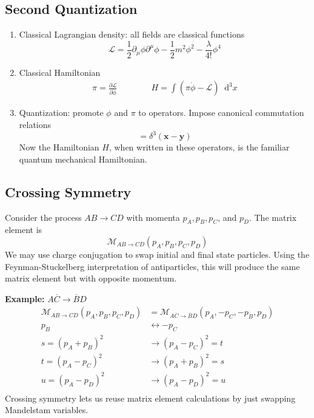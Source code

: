 \documentclass[12pt]{article}
\newcommand{\diff}{\mathop{}\!\mathrm{d}}
\theoremstyle{definition}
\begin{document}
\subsection{Second Quantization}
\begin{enumerate}
    \item Classical Lagrangian density: all fields are classical functions
        \begin{equation*}
            \mathcal{L} = \frac{1}{2} \partial_\mu \phi \partial^\mu \phi - \frac{1}{2} m^2 \phi^2 - \frac{\lambda}{4!}\phi^4
        \end{equation*}
    \item Classical Hamiltonian
        \begin{equation*}
        \begin{split}
            \pi = \frac{\partial \mathcal{L}}{\partial \dot{\phi}} \qquad \qquad
            H = \int (\pi \dot{\phi} - \mathcal{L}) \diff^3 x
        \end{split}
        \end{equation*}
    \item Quantization: promote $\phi$ and $\pi$ to operators. Impose canonical commutation relations
        \begin{equation*}
            [\phi(\bm{x}), \pi(\bm{y})] = \delta^3(\bm{x} - \bm{y})
        \end{equation*}
        Now the Hamiltonian $H$, when written in these operators, is the familiar quantum mechanical
        Hamiltonian.
\end{enumerate}

\subsection{Crossing Symmetry}
Consider the process $AB \to CD$ with momenta $p_A, p_B, p_C$, and $p_D$. The matrix element is
\begin{equation*}
    \mathcal{M}_{AB \to CD} (p_A, p_B, p_C, p_D)
\end{equation*}
We may use charge conjugation to swap initial and final state particles. Using the Feynman-Stuckelberg
interpretation of antiparticles, this will produce the same matrix element but with opposite momentum.

\textbf{Example: }
$A\overline{C} \to \overline{B}D$
\begin{equation*}
\begin{split}
    \mathcal{M}_{AB \to CD}(p_A, p_B, p_C, p_D) &= \mathcal{M}_{A\overline{C} \to \overline{B}D}(p_A, -p_C, -p_B, p_D) \\
    p_B &\leftrightarrow -p_C \\
    s = (p_A + p_B)^2 &\to (p_A - p_C)^2 = t \\
    t = (p_A - p_C)^2 &\to (p_A + p_B)^2 = s \\
    u = (p_A - p_D)^2 &\to (p_A - p_D)^2 = u \\
\end{split}
\end{equation*}
Crossing symmetry lets us reuse matrix element calculations by just swapping Mandelstam variables.
\end{document}
